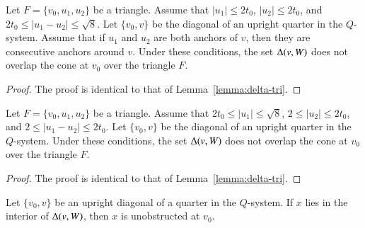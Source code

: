 \begin{lemma}\label{lemma:delta-flat}
Let $F=\{v_0,u_1,u_2\}$ be a triangle.  Assume that $|u_1|\le 2t_0$,
$|u_2|\le 2t_0$, and $2t_0\le|u_1-u_2|\le\sqrt8$.  Let $\{v_0,v\}$
be the diagonal of an upright quarter in the $Q$-system.  Assume
that if $u_1$ and $u_2$ are both anchors of $v$, then they are
consecutive anchors around $v$. Under these conditions, the set
$\Delta(v,W)$ does not overlap the cone at $v_0$ over the triangle
$F$.
\end{lemma}

\begin{proof} The proof is identical to that of
Lemma~\ref{lemma:delta-tri}. 
\end{proof}

\begin{lemma}\label{lemma:delta-upright}
Let $F=\{v_0,u_1,u_2\}$ be a triangle.  Assume that $2t_0\le|u_1|\le
\sqrt8$, $2\le|u_2|\le 2t_0$, and $2\le|u_1-u_2|\le2t_0$.  Let
$\{v_0,v\}$ be the diagonal of an upright quarter in the $Q$-system.
Under these conditions, the set $\Delta(v,W)$ does not overlap
the cone at $v_0$ over the triangle $F$.
\end{lemma}

\begin{proof}
The proof is identical to that of Lemma~\ref{lemma:delta-tri}.
\end{proof}


\begin{lemma}
Let $\{v_0,v\}$ be an upright diagonal of a quarter in the
$Q$-system.   If $x$ lies in the interior of $\Delta(v,W)$,
then $x$ is unobstructed at $v_0$.
\end{lemma}

